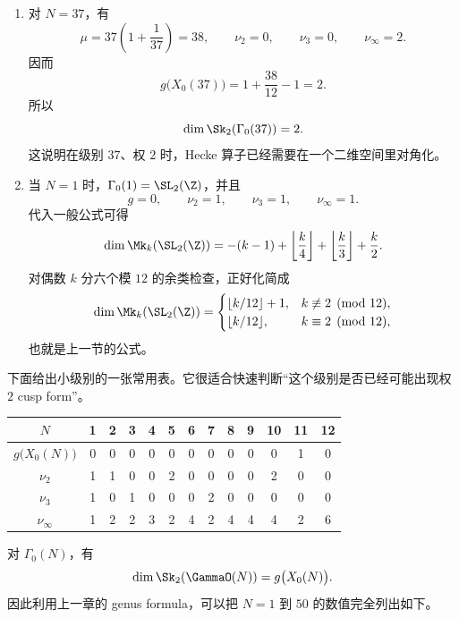 \begin{example}
\label{ex:gamma0-37-and-1}
\begin{enumerate}
  \item 对 $N=37$，有
        \[
          \mu=37\left(1+\frac1{37}\right)=38,
          \qquad \nu_2=0,
          \qquad \nu_3=0,
          \qquad \nu_\infty=2.
        \]
        因而
        \[
          g\bigl(X_0(37)\bigr)=1+\frac{38}{12}-1=2.
        \]
        所以
        \[
          \dim \Sk_2(\Gamma_0(37))=2.
        \]
        这说明在级别 $37$、权 $2$ 时，Hecke 算子已经需要在一个二维空间里对角化。

  \item 当 $N=1$ 时，$\Gamma_0(1)=\SL_2(\Z)$，并且
        \[
          g=0,\qquad \nu_2=1,\qquad \nu_3=1,\qquad \nu_\infty=1.
        \]
        代入一般公式可得
        \[
          \dim \Mk_k(\SL_2(\Z))=-(k-1)+\left\lfloor\frac{k}{4}\right\rfloor+
          \left\lfloor\frac{k}{3}\right\rfloor+\frac{k}{2}.
        \]
        对偶数 $k$ 分六个模 $12$ 的余类检查，正好化简成
        \[
          \dim \Mk_k(\SL_2(\Z))=
          \begin{cases}
            \lfloor k/12\rfloor+1,& k\not\equiv 2\pmod{12},\\
            \lfloor k/12\rfloor,& k\equiv 2\pmod{12},
          \end{cases}
        \]
        也就是上一节的公式。
\end{enumerate}
\end{example}

下面给出小级别的一张常用表。它很适合快速判断“这个级别是否已经可能出现权 $2$ cusp form”。

\begin{center}
\begin{tabular}{c|cccccccccccc}
\toprule
$N$ & 1 & 2 & 3 & 4 & 5 & 6 & 7 & 8 & 9 & 10 & 11 & 12 \\
\midrule
$g\bigl(X_0(N)\bigr)$ & 0 & 0 & 0 & 0 & 0 & 0 & 0 & 0 & 0 & 0 & 1 & 0 \\
$\nu_2$ & 1 & 1 & 0 & 0 & 2 & 0 & 0 & 0 & 0 & 2 & 0 & 0 \\
$\nu_3$ & 1 & 0 & 1 & 0 & 0 & 0 & 2 & 0 & 0 & 0 & 0 & 0 \\
$\nu_\infty$ & 1 & 2 & 2 & 3 & 2 & 4 & 2 & 4 & 4 & 4 & 2 & 6 \\
\bottomrule
\end{tabular}
\end{center}

\begin{proposition}[权 $2$ 的完整小级别表]
\label{prop:dim-s2-table-50}
对 $\Gamma_0(N)$，有
\[
  \dim \Sk_2(\GammaO(N))=g\bigl(X_0(N)\bigr).
\]
因此利用上一章的 genus formula，可以把 $N=1$ 到 $50$ 的数值完全列出如下。
\end{proposition}

